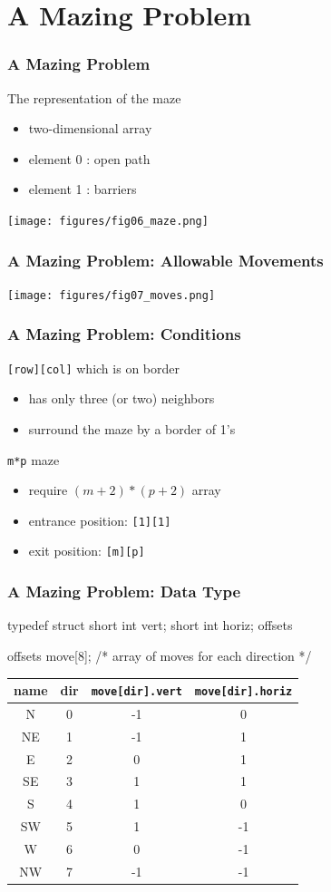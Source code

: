 \documentclass[newPxFont,sthlmFooter,nooffset]{beamer}
\begin{document}
\section{A Mazing Problem}
\begin{frame}[t]
  \frametitle{A Mazing Problem}
The representation of the maze
\begin{itemize}
\item two-dimensional array
\item element 0 : open path
\item element 1 : barriers
\end{itemize}
\texttt{[image: figures/fig06\_maze.png]}
\end{frame}

\begin{frame}[t]
  \frametitle{A Mazing Problem: Allowable Movements}
\texttt{[image: figures/fig07\_moves.png]}
\end{frame}

\begin{frame}[t]
  \frametitle{A Mazing Problem: Conditions}
\texttt{[row][col]} which is on border
\begin{itemize}
\item has only three (or two) neighbors
\item surround the maze by a border of 1's
\end{itemize}

\bigskip
\texttt{m*p} maze
\begin{itemize}
\item require $(m+2) *(p+2)$ array
\item entrance position: \texttt{[1][1]}
\item exit position: \texttt{[m][p]}
\end{itemize}
\end{frame}

\begin{frame}[t, fragile]
  \frametitle{A Mazing Problem: Data Type}
\begin{ncodedef}
typedef struct {
    short int vert;
    short int horiz;
} offsets

offsets move[8]; /* array of moves for each direction */    
\end{ncodedef}

\begin{tabular}{c | c | c | c}
  name & dir & \texttt{move[dir].vert} & \texttt{move[dir].horiz} \\ \hline
N  &  0 & -1 &  0 \\
NE &  1 & -1 &  1 \\
E  &  2 &  0 &  1 \\
SE &  3 &  1 &  1 \\
S  &  4 &  1 &  0 \\
SW &  5 &  1 &  -1 \\
W  &  6 &  0 &  -1 \\
NW &  7 & -1 &  -1 \\
\end{tabular}
\end{frame}
\end{document}
